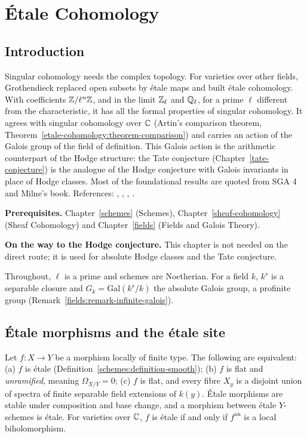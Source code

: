 \chapter{\'Etale Cohomology}\label{etale-cohomology}

\section{Introduction}\label{etale-cohomology:section-introduction}

Singular cohomology needs the complex topology. For varieties over other fields, Grothendieck replaced open subsets by \'etale maps and built \'etale cohomology.
With coefficients $\mathbb{Z}/\ell^n\mathbb{Z}$, and in the limit $\mathbb{Z}_\ell$ and $\mathbb{Q}_\ell$, for a prime $\ell$ different from the characteristic, it has all the formal properties of singular
cohomology. It agrees with singular cohomology over $\mathbb{C}$ (Artin's comparison theorem, Theorem~\ref{etale-cohomology:theorem-comparison}) and carries an action of the
Galois group of the field of definition. This Galois action is the arithmetic counterpart of the Hodge structure: the Tate conjecture (Chapter~\ref{tate-conjecture}) is the
analogue of the Hodge conjecture with Galois invariants in place of Hodge classes. Most of the foundational results are quoted from SGA 4 and Milne's book. References:
\cite{milne-etale}, \cite{sga4-1}, \cite{sga4-3}, \cite{sga4-half}.

\noindent\textbf{Prerequisites.} Chapter~\ref{schemes} (Schemes), Chapter~\ref{sheaf-cohomology} (Sheaf Cohomology) and Chapter~\ref{fields} (Fields and Galois Theory).

\noindent\textbf{On the way to the Hodge conjecture.} This chapter is not needed on the direct route; it is used for absolute Hodge classes and the Tate conjecture.

Throughout, $\ell$ is a prime and schemes are Noetherian. For a field $k$, $k^s$ is a separable closure and $G_k = \mathrm{Gal}(k^s/k)$ the absolute Galois group, a profinite group
(Remark~\ref{fields:remark-infinite-galois}).

\section{\'Etale morphisms and the \'etale site}\label{etale-cohomology:section-etale-site}

\begin{proposition}\label{etale-cohomology:proposition-etale}
Let $f \colon X \to Y$ be a morphism locally of finite type. The following are equivalent: (a) $f$ is \'etale (Definition~\ref{schemes:definition-smooth}); (b) $f$ is flat and
\emph{unramified}, meaning $\Omega_{X/Y} = 0$; (c) $f$ is flat, and every fibre $X_y$ is a disjoint union of spectra of finite separable field extensions of $k(y)$. \'Etale morphisms are
stable under composition and base change, and a morphism between \'etale $Y$-schemes is \'etale. For varieties over $\mathbb{C}$, $f$ is \'etale if and only if $f^{\mathrm{an}}$ is a local
biholomorphism.
\end{proposition}


